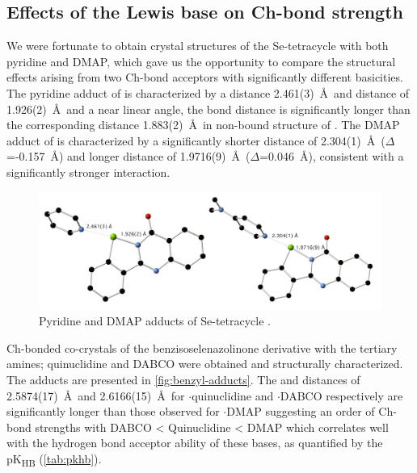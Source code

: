\begin{refsection}
    \subsection{Effects of the Lewis base on Ch-bond strength}
    We were fortunate to obtain crystal structures of the Se-tetracycle  with both pyridine and DMAP, which gave us the opportunity to compare the structural effects arising from two Ch-bond acceptors with significantly different basicities.
    The pyridine adduct of  is characterized by a  distance 2.461(3)~\AA\ and  distance of 1.926(2)~\AA\ and a near linear  angle, the  bond distance is significantly longer than the corresponding distance 1.883(2)~\AA\ in non-bound structure of .
    The DMAP adduct of  is characterized by a significantly shorter  distance of 2.304(1)~\AA\ ($ \Delta $=-0.157~\AA) and longer  distance of 1.9716(9)~\AA\ ($ \Delta $=0.046~\AA), consistent with a significantly stronger interaction.
    
    \begin{figure}
      \centering
      \includegraphics[width=0.8\linewidth]{Figures/dimer-dmap-py-xray.pdf}
      \caption{Pyridine and DMAP adducts of Se-tetracycle .}\label{fig:dimer-adducts}
    \end{figure}
    
    Ch-bonded co-crystals of the benzisoselenazolinone derivative  with the tertiary amines; quinuclidine and DABCO were obtained and structurally characterized.
    The adducts are presented in \cref{fig:benzyl-adducts}.
    The  and  distances of 2.5874(17)~\AA\ and 2.6166(15)~\AA\ for $ \cdot $quinuclidine and $ \cdot $DABCO respectively are significantly longer than those observed for $ \cdot $DMAP suggesting an order of Ch-bond strengths with  DABCO < Quinuclidine < DMAP which correlates well with the hydrogen bond acceptor ability of these bases, as quantified by the pK\textsubscript{HB} (\cref{tab:pkhb}).
    

\end{refsection}
